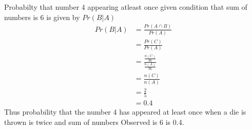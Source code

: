\begin{enumerate}[label=\thesection.\arabic*.,ref=\thesection.\theenumi]
\begin{enumerate}
    Probabilty that number 4 appearing atleast once given condition that sum of numbers is 6 is given by $Pr(B|A)$ 
    \begin{align}
        Pr(B|A) &= \frac{Pr(A \cap B)}{Pr(A)} \\
        &= \frac{Pr(C)}{Pr(A)} \\ 
        &= \frac{\frac{n(C)}{36}}{\frac{n(A)}{36}}\\
        &= \frac{n(C)}{n(A)}\\
        &= \frac{2}{5} \\ 
        &= 0.4
    \end{align}
    Thus probability that the number 4 has appeared at least once when a die is thrown is twice and sum of numbers Observed is 6 is 0.4.
\end{enumerate}

\end{enumerate}